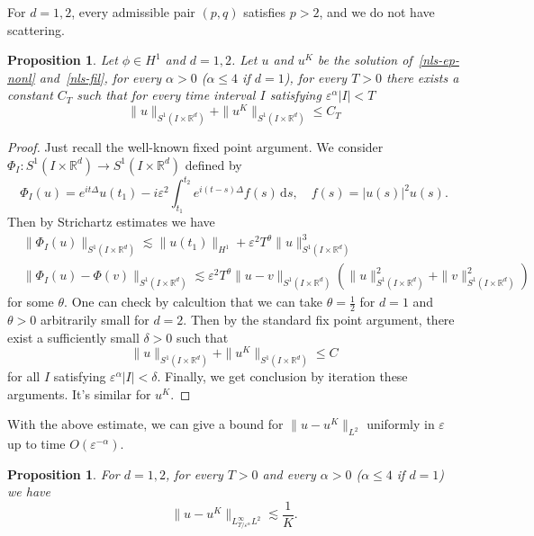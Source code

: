 \documentclass[10pt,a4paper]{article}
\newtheorem{proposition}[theorem]{Proposition}
\begin{document}
  For \(d=1,2\), every admissible pair \((p,q)\) satisfies \(p>2\), and we do not
  have scattering. 

  \begin{proposition}
    Let \(\phi\in H^1\) and \(d=1,2\). Let \(u\) and \(u^K\) be the solution 
    of~\eqref{nls-ep-nonl} and~\eqref{nls-fil}, for every \(\alpha>0\) (\(\alpha
    \leq 4\) if \(d=1\)), for every \(T>0\) there exists a constant \(C_T\) such that for every
    time interval \(I\) satisfying \(\varepsilon^\alpha|I|<T\)
    \[ \|u\|_{S^1(I\times\mathbb R^d)} + \|u^K\|_{S^1(I\times\mathbb R^d)} \leq C_T \]
  \end{proposition}

  \begin{proof}
    Just recall the well-known fixed point argument. We consider 
    \(\Phi_I: S^1(I\times\mathbb R^d) \to S^1(I\times\mathbb R^d)\) 
    defined by
    \[ \Phi_I(u) = e^{it\Delta} u(t_1) - i\varepsilon^2 \int_{t_1}^{t_2} e^{i(t-s)\Delta}
    f(s)\,\mathrm{d}s, \quad f(s)=|u(s)|^2u(s). \]
    Then by Strichartz estimates we have
    \begin{equation}
      \begin{aligned}
        & \|\Phi_I(u)\|_{S^1(I\times\mathbb R^d)} \lesssim \|u(t_1)\|_{H^1} + \varepsilon^2
        T^\theta \|u\|_{S^1(I\times\mathbb R^d)}^3 \\
        & \|\Phi_I(u)-\Phi(v)\|_{S^1(I\times\mathbb R^d)} \lesssim \varepsilon^2
        T^\theta \|u-v\|_{S^1(I\times\mathbb R^d)} (\|u\|_{S^1(I\times\mathbb R^d)}^2 + \|v\|_{S^1(I\times\mathbb R^d)}^2) 
      \end{aligned}
    \end{equation}
    for some \(\theta\). One can check by calcultion that we can take
    \(\theta=\frac12\) for \(d=1\) and \(\theta>0\) arbitrarily small for \(d=2\).
    Then by the standard fix point argument, there exist a sufficiently small
    \(\delta>0\) such that 
    \[ \|u\|_{S^1(I\times\mathbb R^d)} + \|u^K\|_{S^1(I\times\mathbb R^d)} \leq C \]
    for all \(I\) satisfying \(\varepsilon^\alpha|I|<\delta\). Finally, we get
    conclusion by iteration these arguments. It's similar for \(u^K\).
  \end{proof}

  With the above estimate, we can give a bound for \(\|u-u^K\|_{L^2}\) uniformly
  in \(\varepsilon\) up to time \(O(\varepsilon^{-\alpha})\).

  \begin{proposition}\label{u-uKLinftyL2d12}
    For \(d=1,2\), for every \(T>0\) and every \(\alpha>0\) (\(\alpha \leq 4\) if \(d=1\)) 
    we have 
    \begin{equation}
      \|u-u^K\|_{L^\infty_{T/\varepsilon^\alpha}L^2} \lesssim \frac1K.
    \end{equation}
  \end{proposition}
\end{document}
